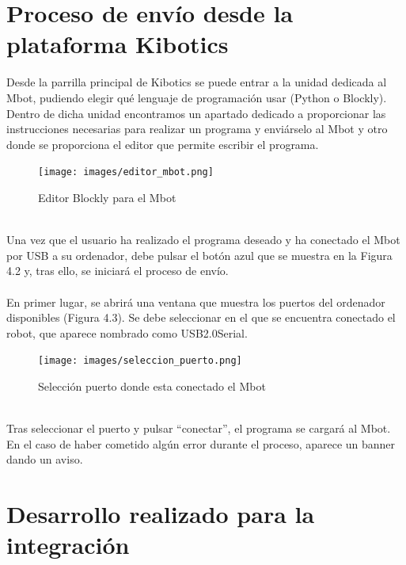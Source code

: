 \documentclass{report}
\begin{document}
\section{Proceso de envío desde la plataforma Kibotics}

Desde la parrilla principal de Kibotics se puede entrar a la unidad dedicada al Mbot, pudiendo elegir qué lenguaje de programación usar (Python o Blockly). Dentro de dicha unidad encontramos un apartado dedicado a proporcionar las instrucciones necesarias para realizar un programa y enviárselo al Mbot y otro donde se proporciona el editor que permite escribir el programa.
\\
\begin{figure}[h!]
  \centering
    \texttt{[image: images/editor\_mbot.png]}
  \caption{Editor Blockly para el Mbot }
  \label{figura:Editor Blockly para el Mbot }
\end{figure}
\\
Una vez que el usuario ha realizado el programa deseado y ha conectado el Mbot por USB a su ordenador, debe pulsar el botón azul que se muestra en la Figura 4.2 y, tras ello, se iniciará el proceso de envío.
\\
\\
En primer lugar, se abrirá una ventana que muestra los puertos del ordenador disponibles (Figura 4.3). Se debe seleccionar en el que se encuentra conectado el robot, que aparece nombrado como USB2.0Serial.
\\
\begin{figure}[h!]
  \centering
    \texttt{[image: images/seleccion\_puerto.png]}
  \caption{Selección puerto donde esta conectado el Mbot}
  \label{Selección puerto donde esta conectado el Mbot}
\end{figure}
\\
Tras seleccionar el puerto y pulsar “conectar”, el programa se cargará al Mbot. En el caso de haber cometido algún error durante el proceso, aparece un banner dando un aviso.

\section{Desarrollo realizado para la integración}
\end{document}
